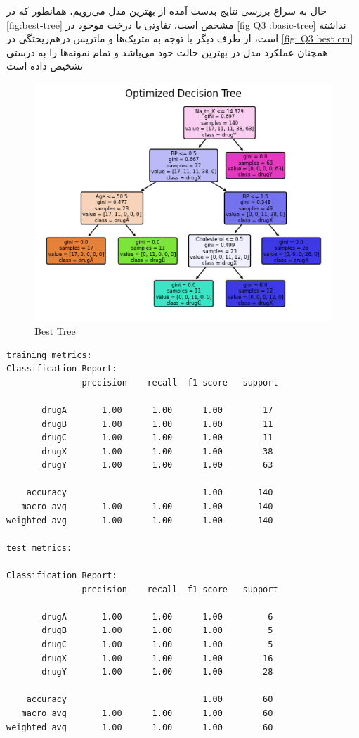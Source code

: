 \documentclass{article}
\begin{document}
حال به سراغ بررسی نتایج بدست آمده از بهترین مدل می‌رویم، همانطور که در 
\autoref{fig:best-tree}
مشخص است، تفاوتی با درخت موجود در 
\autoref{fig Q3 :basic-tree}
نداشته است، از طرف دیگر با توجه به متریک‌ها و ماتریس درهم‌ریختگی در 
\autoref{fig: Q3 best cm}
همچنان عملکرد مدل در بهترین حالت خود می‌باشد و تمام نمونه‌ها را به درستی تشخیص داده است
\begin{figure}[H]
\centering
\includegraphics[width=0.7\linewidth]{"img/Q3/Best tree"}
\caption{Best Tree}
\label{fig:best-tree}
\end{figure}

\begin{LTR}
\begin{verbatim}
training metrics:
Classification Report:
               precision    recall  f1-score   support

       drugA       1.00      1.00      1.00        17
       drugB       1.00      1.00      1.00        11
       drugC       1.00      1.00      1.00        11
       drugX       1.00      1.00      1.00        38
       drugY       1.00      1.00      1.00        63

    accuracy                           1.00       140
   macro avg       1.00      1.00      1.00       140
weighted avg       1.00      1.00      1.00       140

test metrics:

Classification Report:
               precision    recall  f1-score   support

       drugA       1.00      1.00      1.00         6
       drugB       1.00      1.00      1.00         5
       drugC       1.00      1.00      1.00         5
       drugX       1.00      1.00      1.00        16
       drugY       1.00      1.00      1.00        28

    accuracy                           1.00        60
   macro avg       1.00      1.00      1.00        60
weighted avg       1.00      1.00      1.00        60
\end{verbatim}
\end{LTR}
\end{document}
